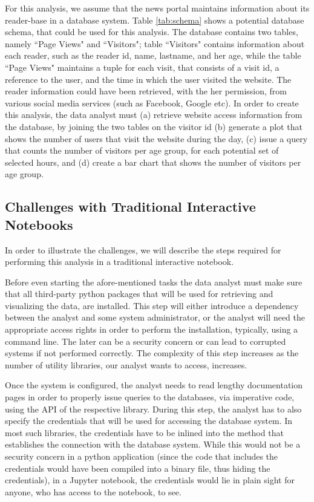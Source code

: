 For this analysis, we assume that the news portal maintains information about its reader-base in a database system. Table \ref{tab:schema} shows a potential database schema, that could be used for this analysis. The database contains two tables, namely ``Page Views" and ``Visitors"; table ``Visitors" contains information about each reader, such as the reader id, name, lastname, and her age, while the table ``Page Views" maintains a tuple for each visit, that consists of a visit id, a reference to the user, and the time in which the user visited the website. The reader information could have been retrieved, with the her permission, from various social media services (such as Facebook, Google etc). In order to create this analysis, the data analyst must (a) retrieve  website access information from the database, by joining the two tables on the visitor id (b) generate a plot that shows the number of users that visit the website during the day, (c) issue a query that counts the number of visitors per age group, for each potential set of selected hours, and (d) create a bar chart that shows the number of visitors per age group. 


\subsection{Challenges with Traditional Interactive Notebooks}



In order to illustrate the challenges, we will describe the steps required for performing this analysis in a traditional interactive notebook.

 Before even starting the afore-mentioned tasks the data analyst must make sure that all  third-party python packages that will be used for retrieving and visualizing the data, are installed. This step will either introduce a dependency between the analyst and some system administrator, or the analyst will need the appropriate access rights in order to perform the installation, typically, using a command line. The later can be a security concern or can lead to corrupted systems if not performed correctly. The complexity of this step increases as the number of utility libraries, our analyst wants to access, increases. 

Once the system is configured, the analyst needs to read lengthy documentation pages in order to properly issue queries to the databases, via imperative code, using the API of the respective library. During this step, the analyst has to also specify the credentials that will be used for accessing the database system. In most such libraries, the credentials have to be inlined into the method that establishes the connection with the database system. While this would not be a security concern in a python application (since the code that includes the credentials would have been compiled into a binary file, thus hiding the credentials), in a Jupyter notebook, the credentials would lie in plain sight for anyone, who has access to the notebook, to see.


